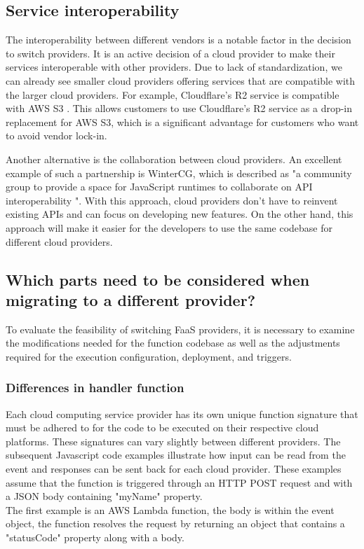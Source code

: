 \subsection{Service interoperability}
\label{subsec:service-interoperability}

The interoperability between different vendors is a notable factor in the decision to switch providers. It is an active decision of a cloud provider to make their services interoperable with other providers. Due to lack of standardization, we can already see smaller cloud providers offering services that are compatible with the larger cloud providers. For example, Cloudflare's R2 service is compatible with AWS S3 \cite{cloudflareinc_cloudflare}. This allows customers to use Cloudflare's R2 service as a drop-in replacement for AWS S3, which is a significant advantage for customers who want to avoid vendor lock-in. 

Another alternative is the collaboration between cloud providers. An excellent example of such a partnership is WinterCG, which is described as "a community group to provide a space for JavaScript runtimes to collaborate on API interoperability \cite{webinteroperableruntimescommunitygroup_wintercg}". With this approach, cloud providers don't have to reinvent existing APIs and can focus on developing new features. On the other hand, this approach will make it easier for the developers to use the same codebase for different cloud providers.

\subsection{Which parts need to be considered when migrating to a different provider?}
To evaluate the feasibility of switching \Gls{FaaS} providers, it is necessary to examine the modifications needed for the function codebase as well as the adjustments required for the execution configuration, deployment, and triggers.

\subsubsection{Differences in handler function}
Each \gls{cloud computing} service provider has its own unique function signature that must be adhered to for the code to be executed on their respective cloud platforms. These signatures can vary slightly between different providers. The subsequent Javascript code examples illustrate how input can be read from the event and responses can be sent back for each cloud provider. These examples assume that the function is triggered through an HTTP POST request and with a JSON body containing "myName" property. \\
The first example is an AWS Lambda function, the body is within the event object, the function resolves the request by returning an object that contains a "statusCode" property along with a body.

